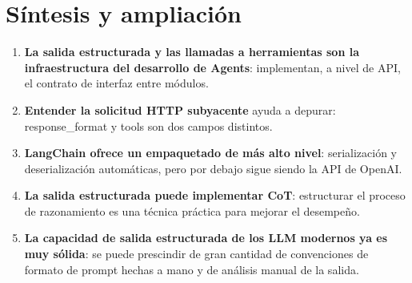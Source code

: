 \section{Síntesis y ampliación}

\begin{enumerate}
    \item \textbf{La salida estructurada y las llamadas a herramientas son la infraestructura del desarrollo de Agents}: implementan, a nivel de API, el contrato de interfaz entre módulos.
    \item \textbf{Entender la solicitud HTTP subyacente} ayuda a depurar: response\_format y tools son dos campos distintos.
    \item \textbf{LangChain ofrece un empaquetado de más alto nivel}: serialización y deserialización automáticas, pero por debajo sigue siendo la API de OpenAI.
    \item \textbf{La salida estructurada puede implementar CoT}: estructurar el proceso de razonamiento es una técnica práctica para mejorar el desempeño.
    \item \textbf{La capacidad de salida estructurada de los LLM modernos ya es muy sólida}: se puede prescindir de gran cantidad de convenciones de formato de prompt hechas a mano y de análisis manual de la salida.
\end{enumerate}


